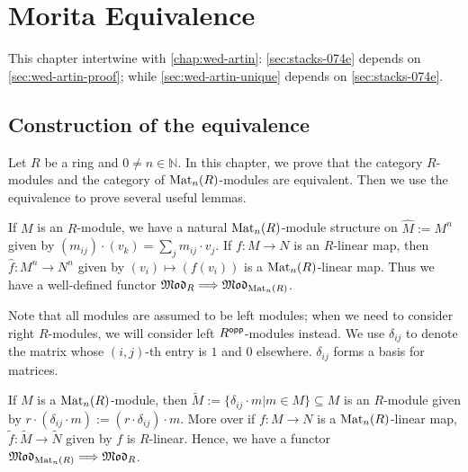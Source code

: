 \chapter{Morita Equivalence}\label{chap:morita}

This chapter intertwine with \cref{chap:wed-artin}: \cref{sec:stacks-074e} depends on \cref{sec:wed-artin-proof}; while \cref{sec:wed-artin-unique} depends on \cref{sec:stacks-074e}.

\section{Construction of the equivalence}\label{sec:morita-construction}

Let $R$ be a ring and $0 \ne n\in \mathbb{N}$. In this chapter, we prove that the category $R$-modules and the category of $\operatorname{Mat}_{n}(R)$-modules are equivalent. Then we use the equivalence to prove several useful lemmas.

\begin{construction}\label{con:morita-eqv-functor0}
  \leanok
  If $M$ is an $R$-module, we have a natural $\operatorname{Mat}_{n}(R)$-module structure on $\hat{M}:=M^{n}$ given by $(m_{ij})\cdot (v_{k})=\sum_{j}m_{ij}\cdot v_{j}$.
  If $f : M \to N$ is an $R$-linear map, then $\hat{f} : M^{n}\to N^{n}$ given by $(v_{i}) \mapsto (f(v_{i}))$ is a $\operatorname{Mat}_{n}(R)$-linear map. Thus we have a well-defined functor $\operatorname{\mathfrak{Mod}}_{R} \Longrightarrow \operatorname{\mathfrak{Mod}}_{\operatorname{Mat}_{n}(R)}$.
\end{construction}

\begin{remark}
Note that all modules are assumed to be left modules; when we need to consider right $R$-modules, we will consider left $R^{\mathsf{opp}}$-modules instead. We use $\delta_{ij}$ to denote the matrix whose $(i,j)$-th entry is $1$ and $0$ elsewhere. $\delta_{ij}$ forms a basis for matrices.
\end{remark}

\begin{construction}\label{con:morita-eqv-functor1}
  \leanok
  If $M$ is a $\operatorname{Mat}_{n}(R)$-module, then $\tilde{M} := \{\delta_{ij}\cdot m | m \in M\} \subseteq M$ is an $R$-module given by $r \cdot (\delta_{ij}\cdot m) := (r\cdot \delta_{ij})\cdot m$. More over if $f : M \to N$ is a $\operatorname{Mat}_{n}(R)$-linear map, $\tilde{f} : \tilde{M} \to \tilde{N}$ given by $f$ is $R$-linear. Hence, we have a functor $\operatorname{\mathfrak{Mod}}_{\operatorname{Mat}_{n}(R)}\Longrightarrow \operatorname{\mathfrak{Mod}}_{R}$.
\end{construction}

